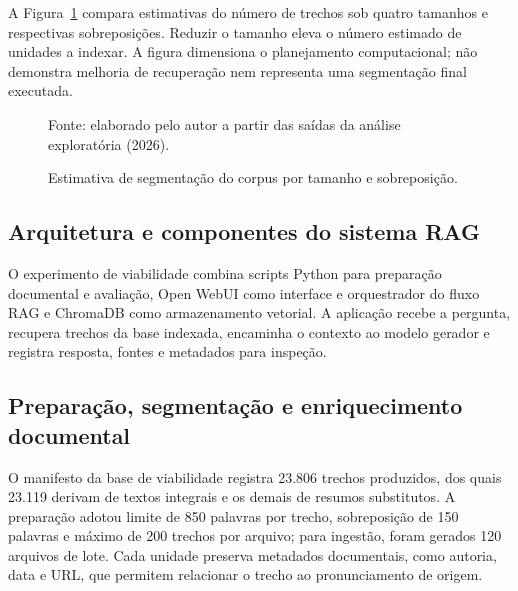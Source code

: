 A Figura~\ref{fig:estimativa-segmentacao} compara estimativas do número de trechos sob quatro tamanhos e respectivas sobreposições. Reduzir o tamanho eleva o número estimado de unidades a indexar. A figura dimensiona o planejamento computacional; não demonstra melhoria de recuperação nem representa uma segmentação final executada.
\begin{figure}[htbp]
\centering
{}
\caption{Estimativa de segmentação do corpus por tamanho e sobreposição.}\label{fig:estimativa-segmentacao}
\par\smallskip Fonte: elaborado pelo autor a partir das saídas da análise exploratória (2026).
\end{figure}

\subsection{Arquitetura e componentes do sistema RAG}

O experimento de viabilidade combina scripts Python para preparação documental e avaliação, Open WebUI como interface e orquestrador do fluxo RAG e ChromaDB como armazenamento vetorial. A aplicação recebe a pergunta, recupera trechos da base indexada, encaminha o contexto ao modelo gerador e registra resposta, fontes e metadados para inspeção.

\subsection{Preparação, segmentação e enriquecimento documental}\label{sec:preparacao-corpus}

O manifesto da base de viabilidade registra 23.806 trechos produzidos, dos quais 23.119 derivam de textos integrais e os demais de resumos substitutos. A preparação adotou limite de 850 palavras por trecho, sobreposição de 150 palavras e máximo de 200 trechos por arquivo; para ingestão, foram gerados 120 arquivos de lote. Cada unidade preserva metadados documentais, como autoria, data e URL, que permitem relacionar o trecho ao pronunciamento de origem.

